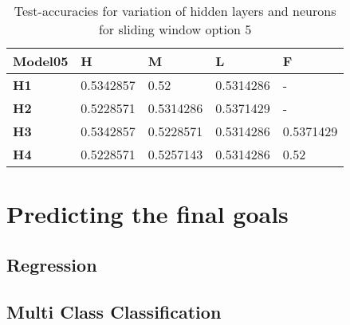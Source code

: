 \begin{table}
\centering
\begin{tabular}{|l|l|l|l|l|}
\hline

\textbf{Model05} & \textbf{H} & \textbf{M} & \textbf{L} & \textbf{F} \\ \hline
\textbf{H1} & 0.5342857 & 0.52 & 0.5314286 & - \\ \hline
\textbf{H2} & 0.5228571 & 0.5314286 & 0.5371429 & - \\ \hline
\textbf{H3} & 0.5342857 & 0.5228571 & 0.5314286 & 0.5371429 \\ \hline
\textbf{H4} & 0.5228571 & 0.5257143 & 0.5314286 & 0.52 \\ \hline

\end{tabular}
\caption{Test-accuracies for variation of hidden layers and neurons for sliding window option 5}
\label{table:nn_variation_sliding_05}
\end{table}

\section{Predicting the final goals}
\subsection{Regression}
\subsection{Multi Class Classification}
